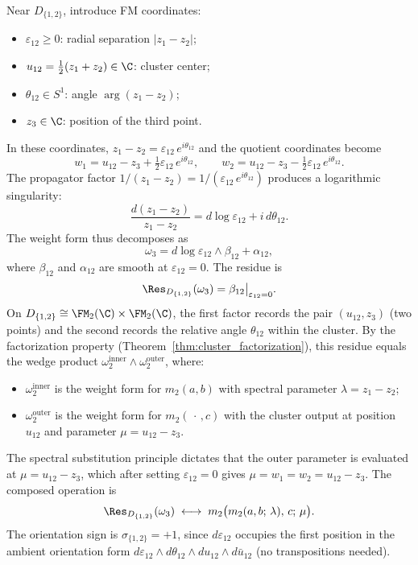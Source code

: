 \begin{computation}[$D_{\{1,2\}}$ residue]
\label{comp:D12}
Near $D_{\{1,2\}}$, introduce FM coordinates:
\begin{itemize}
\item $\varepsilon_{12} \geq 0$: radial separation $|z_1 - z_2|$;
\item $u_{12} = \tfrac{1}{2}(z_1 + z_2) \in \C$: cluster center;
\item $\theta_{12} \in S^1$: angle $\arg(z_1 - z_2)$;
\item $z_3 \in \C$: position of the third point.
\end{itemize}
In these coordinates, $z_1 - z_2 = \varepsilon_{12}\, e^{i\theta_{12}}$ and the quotient coordinates become
\[
w_1 = u_{12} - z_3 + \tfrac{1}{2}\varepsilon_{12}\, e^{i\theta_{12}}, \qquad
w_2 = u_{12} - z_3 - \tfrac{1}{2}\varepsilon_{12}\, e^{i\theta_{12}}.
\]
The propagator factor $1/(z_1 - z_2) = 1/(\varepsilon_{12}\, e^{i\theta_{12}})$ produces a logarithmic singularity:
\[
\frac{d(z_1 - z_2)}{z_1 - z_2} = d\log\varepsilon_{12} + i\, d\theta_{12}.
\]
The weight form thus decomposes as
\[
\omega_3 = d\log\varepsilon_{12} \wedge \beta_{12} + \alpha_{12},
\]
where $\beta_{12}$ and $\alpha_{12}$ are smooth at $\varepsilon_{12} = 0$. The residue is
\[
\Res_{D_{\{1,2\}}}(\omega_3) = \beta_{12}\big|_{\varepsilon_{12}=0}.
\]
On $D_{\{1,2\}} \cong \FM_2(\C) \times \FM_2(\C)$, the first factor records the pair $(u_{12}, z_3)$ (two points) and the second records the relative angle $\theta_{12}$ within the cluster. By the factorization property (Theorem~\ref{thm:cluster_factorization}), this residue equals the wedge product $\omega_2^{\text{inner}} \wedge \omega_2^{\text{outer}}$, where:
\begin{itemize}
\item $\omega_2^{\text{inner}}$ is the weight form for $m_2(a, b)$ with spectral parameter $\lambda = z_1 - z_2$;
\item $\omega_2^{\text{outer}}$ is the weight form for $m_2(\,\cdot\,, c)$ with the cluster output at position $u_{12}$ and parameter $\mu = u_{12} - z_3$.
\end{itemize}
The spectral substitution principle dictates that the outer parameter is evaluated at $\mu = u_{12} - z_3$, which after setting $\varepsilon_{12} = 0$ gives $\mu = w_1 = w_2 = u_{12} - z_3$. The composed operation is
\[
\Res_{D_{\{1,2\}}}(\omega_3) \;\longleftrightarrow\; m_2\bigl(m_2(a, b;\, \lambda),\, c;\, \mu\bigr).
\]
The orientation sign is $\sigma_{\{1,2\}} = +1$, since $d\varepsilon_{12}$ occupies the first position in the ambient orientation form $d\varepsilon_{12} \wedge d\theta_{12} \wedge du_{12} \wedge d\bar{u}_{12}$ (no transpositions needed).
\end{computation}

